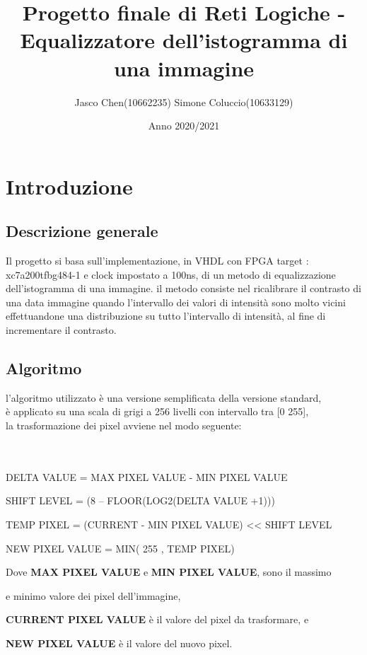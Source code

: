 \documentclass[a4paper, 12pt]{report}
\begin{document}
	\title{Progetto finale di Reti Logiche - Equalizzatore dell'istogramma di una immagine}\author{Jasco Chen(10662235) Simone Coluccio(10633129)}\date{Anno 2020/2021}
	\maketitle

	\tableofcontents
	\chapter{Introduzione}
		\section{Descrizione generale}
			Il progetto si basa sull'implementazione, in VHDL con FPGA target :\\xc7a200tfbg484-1 e clock impostato a 100ns,
			di un metodo di equalizzazione dell'istogramma di una immagine.
			il metodo consiste nel ricalibrare il contrasto di una data immagine quando l'intervallo dei valori di intensità
			sono molto vicini effettuandone una distribuzione su tutto
			l'intervallo di intensità, al fine di incrementare il contrasto.
		\section{Algoritmo}
			l'algoritmo utilizzato è una versione semplificata della versione standard,\\
			è applicato su una scala di grigi a 256 livelli con intervallo tra [0 255],\\
		 	la trasformazione dei pixel avviene nel modo seguente:\\\\\\\par
					 DELTA VALUE = MAX PIXEL VALUE - MIN PIXEL VALUE\par
					 SHIFT LEVEL = (8 – FLOOR(LOG2(DELTA VALUE +1)))\par 
					 TEMP PIXEL = (CURRENT - MIN PIXEL VALUE) << SHIFT LEVEL\par
					 NEW PIXEL VALUE = MIN( 255 , TEMP PIXEL) \\\par
			Dove \textbf{MAX PIXEL VALUE} e \textbf{MIN PIXEL VALUE}, sono il massimo\par 
			e minimo valore dei pixel dell’immagine,\par
			\textbf{CURRENT PIXEL VALUE} è il valore del pixel da trasformare, e\par
			\textbf{NEW PIXEL VALUE} è il valore del nuovo pixel.\\\\\\\\
\end{document}
